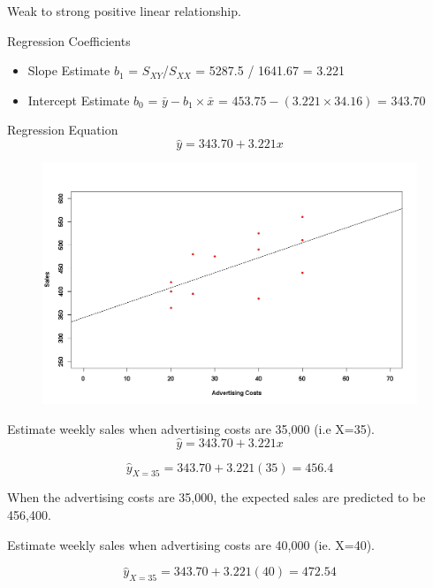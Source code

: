 \documentclass[]{report}
\begin{document}
Weak to strong positive linear relationship.


Regression Coefficients
\begin{itemize}
	\item Slope Estimate $b_1$ = $S_{XY}$/$S_{XX}$ = 5287.5 / 1641.67 = 3.221
	\item Intercept Estimate $b_0$ = $\bar{y} - b_1 \times \bar{x}$ = $453.75-(3.221\times 34.16)$ = 343.70
\end{itemize}
Regression Equation
\[ \hat{y} = 343.70 + 3.221x \]



\begin{center}
	\begin{figure}
		\includegraphics[scale=0.3]{images/12Bplot2.jpeg}\\
	\end{figure}
\end{center}



Estimate weekly sales when advertising costs are 35,000 (i.e X=35).
\[ \hat{y} = 343.70 + 3.221x \]

\[ \hat{y}_{X=35} = 343.70 + 3.221(35)  = 456.4 \]

When the advertising costs are 35,000, the expected sales are predicted to be 456,400.

Estimate weekly sales when advertising costs are 40,000 (ie. X=40).


\[ \hat{y}_{X=35} = 343.70 + 3.221(40)  = 472.54 \]
\end{document}

